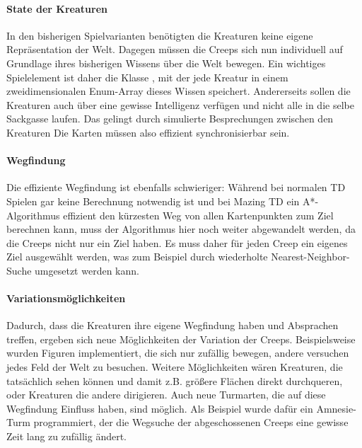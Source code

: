
\paragraph{State der Kreaturen} In den bisherigen Spielvarianten benötigten die Kreaturen keine eigene Repräsentation der Welt. Dagegen müssen die Creeps sich nun individuell auf Grundlage ihres bisherigen Wissens über die Welt bewegen. Ein wichtiges Spielelement ist daher die Klasse , mit der jede Kreatur in einem zweidimensionalen Enum-Array dieses Wissen speichert. Andererseits sollen die Kreaturen auch über eine gewisse Intelligenz verfügen und nicht alle in die selbe Sackgasse laufen. Das gelingt durch simulierte Besprechungen zwischen den Kreaturen Die Karten müssen also effizient synchronisierbar sein. 

\paragraph{Wegfindung} Die effiziente Wegfindung ist ebenfalls schwieriger: Während bei normalen TD Spielen gar keine Berechnung notwendig ist und bei Mazing TD ein A*-Algorithmus effizient den kürzesten Weg von allen Kartenpunkten zum Ziel berechnen kann, muss der Algorithmus hier noch weiter abgewandelt werden, da die Creeps nicht nur ein Ziel haben. Es muss daher für jeden Creep ein eigenes Ziel ausgewählt werden, was zum Beispiel durch wiederholte Nearest-Neighbor-Suche umgesetzt werden kann.

\paragraph{Variationsmöglichkeiten} Dadurch, dass die Kreaturen ihre eigene Wegfindung haben und Absprachen treffen, ergeben sich neue Möglichkeiten der Variation der Creeps. Beispielsweise wurden Figuren implementiert, die sich nur zufällig bewegen, andere versuchen jedes Feld der Welt zu besuchen. Weitere Möglichkeiten wären Kreaturen, die tatsächlich sehen können und damit z.B. größere Flächen direkt durchqueren, oder Kreaturen die andere dirigieren. Auch neue Turmarten, die auf diese Wegfindung Einfluss haben, sind möglich. Als Beispiel wurde dafür ein Amnesie-Turm programmiert, der die Wegsuche der abgeschossenen Creeps eine gewisse Zeit lang zu zufällig ändert.

